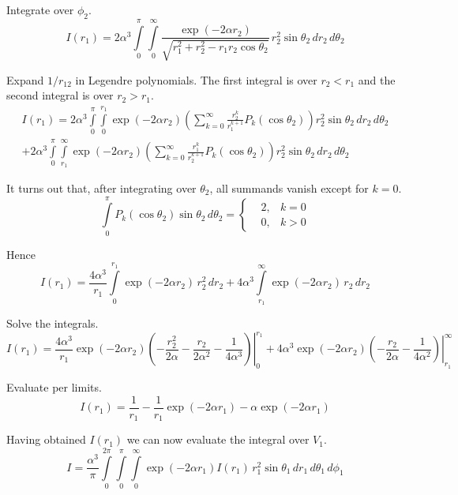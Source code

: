 \documentclass[12pt]{article}
\begin{document}
Integrate over $\phi_2$.
\begin{equation*}
I(r_1)=
2\alpha^3\int\limits_0^\pi\int\limits_0^\infty
\frac{\exp(-2\alpha r_2)}{\sqrt{r_1^2+r_2^2-r_1r_2\cos\theta_2}}
\,r_2^2\sin\theta_2\,dr_2\,d\theta_2
\end{equation*}

Expand $1/r_{12}$ in Legendre polynomials.
The first integral is over $r_2<r_1$ and the second integral is over $r_2>r_1$.
\begin{multline*}
I(r_1)=
2\alpha^3\int\limits_0^\pi\int\limits_0^{r_1}
\exp(-2\alpha r_2)
\left(\sum_{k=0}^\infty\frac{r_2^k}{r_1^{k+1}}P_k(\cos\theta_2)\right)
r_2^2\sin\theta_2\,dr_2\,d\theta_2
\\
+2\alpha^3\int\limits_0^\pi\int\limits_{r_1}^\infty
\exp(-2\alpha r_2)
\left(\sum_{k=0}^\infty\frac{r_1^k}{r_2^{k+1}}P_k(\cos\theta_2)\right)
r_2^2\sin\theta_2\,dr_2\,d\theta_2
\end{multline*}

It turns out that, after integrating over $\theta_2$, all summands vanish except for $k=0$.
\begin{equation*}
\int\limits_0^\pi P_k(\cos\theta_2)\sin\theta_2\,d\theta_2=
\left\{
\begin{aligned}
&2, & k=0
\\
&0, & k>0
\end{aligned}\right.
\tag{5}
\end{equation*}

Hence
\begin{equation*}
I(r_1)=
\frac{4\alpha^3}{r_1}\int\limits_0^{r_1}\exp(-2\alpha r_2)\,r_2^2\,dr_2
+4\alpha^3\int\limits_{r_1}^\infty\exp(-2\alpha r_2)\,r_2\,dr_2
\end{equation*}

Solve the integrals.
\begin{equation*}
I(r_1)=
\frac{4\alpha^3}{r_1}
\left.
\exp(-2\alpha r_2)\left(-\frac{r_2^2}{2\alpha}-\frac{r_2}{2\alpha^2}-\frac{1}{4\alpha^3}
\right)\right|_0^{r_1}
+4\alpha^3\left.\exp(-2\alpha r_2)\left(-\frac{r_2}{2\alpha}-\frac{1}{4\alpha^2}\right)\right|_{r_1}^\infty
\end{equation*}

Evaluate per limits.
\begin{equation*}
I(r_1)=\frac{1}{r_1}-\frac{1}{r_1}\exp(-2\alpha r_1)-\alpha\exp(-2\alpha r_1)
\tag{6}
\end{equation*}

Having obtained $I(r_1)$ we can now evaluate the integral over $V_1$.
\begin{equation*}
I=\frac{\alpha^3}{\pi}\int\limits_0^{2\pi}\int\limits_0^\pi\int\limits_0^\infty
\exp(-2\alpha r_1)I(r_1)\,r_1^2\sin\theta_1\,dr_1\,d\theta_1\,d\phi_1
\end{equation*}
\end{document}
